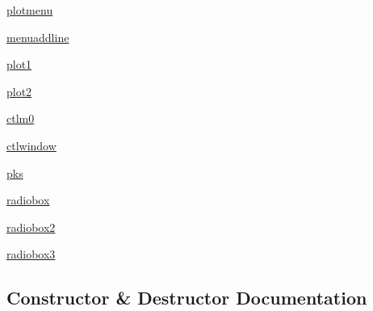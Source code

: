 \begin{DoxyCompactItemize}
\item 
\hyperlink{class_uni_dec_1_1unidec__modules_1_1_mass_defects_1_1_mass_defect_window_a08730295a417f9fdfef20d4fb1514ed1}{plotmenu}
\item 
\hyperlink{class_uni_dec_1_1unidec__modules_1_1_mass_defects_1_1_mass_defect_window_af8489b6e76672de008e894d15a5a4434}{menuaddline}
\item 
\hyperlink{class_uni_dec_1_1unidec__modules_1_1_mass_defects_1_1_mass_defect_window_af0e067c15eb698b8e145ef76783153c3}{plot1}
\item 
\hyperlink{class_uni_dec_1_1unidec__modules_1_1_mass_defects_1_1_mass_defect_window_a250668cd5e200b58a725569bd352b2f1}{plot2}
\item 
\hyperlink{class_uni_dec_1_1unidec__modules_1_1_mass_defects_1_1_mass_defect_window_aa51040de91da4057b585f9de9d3d94b8}{ctlm0}
\item 
\hyperlink{class_uni_dec_1_1unidec__modules_1_1_mass_defects_1_1_mass_defect_window_abd065f0108516c5bc84fc771d97ff51c}{ctlwindow}
\item 
\hyperlink{class_uni_dec_1_1unidec__modules_1_1_mass_defects_1_1_mass_defect_window_aa489bd3c455ab9d294dee7f603f762f2}{pks}
\item 
\hyperlink{class_uni_dec_1_1unidec__modules_1_1_mass_defects_1_1_mass_defect_window_a6632c67a83af3c2e669b9697570caaf5}{radiobox}
\item 
\hyperlink{class_uni_dec_1_1unidec__modules_1_1_mass_defects_1_1_mass_defect_window_a27c8f4a9ae3a2197d6e1bcafe4ff9c87}{radiobox2}
\item 
\hyperlink{class_uni_dec_1_1unidec__modules_1_1_mass_defects_1_1_mass_defect_window_ab4e7e9c43ae7f1e147d40d85bae5699f}{radiobox3}
\end{DoxyCompactItemize}


\subsection{Constructor \& Destructor Documentation}
\hypertarget{class_uni_dec_1_1unidec__modules_1_1_mass_defects_1_1_mass_defect_window_adb2a3ef6597b910fe5db19cb981abfce}{}
